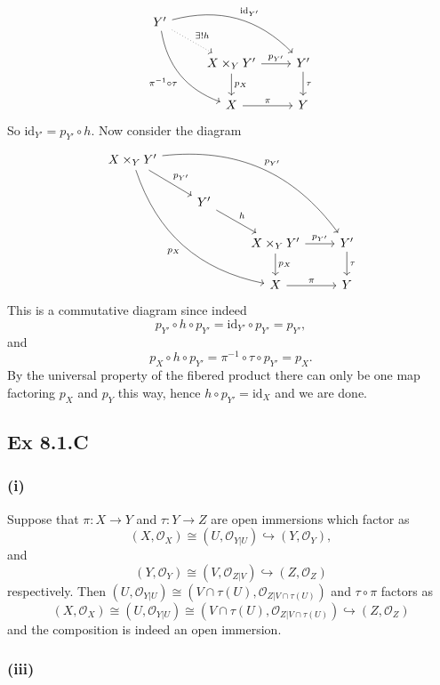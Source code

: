 \documentclass{article}
\theoremstyle{definition}
\newcommand{\id}{\text{id}}
\begin{document}
\[
	\begin{tikzcd}
		Y'
		\ar[dr, dotted, "\exists! h"]
		\ar[drr, "\id_{Y'}", bend left=30]
		\ar[ddr, "\pi^{-1} \circ \tau", bend right=30, swap=true]
		\\
		& X \times_{Y} Y'
		\ar[r, "p_{Y'}"]
		\ar[d, "p_X"]
		& Y'
		\ar[d, "\tau"] \\
		& X
		\ar[r, "\pi"]
		& Y
	\end{tikzcd}
\]
So $\id_{Y'} = p_{Y'} \circ h$. Now consider the diagram
\[
	\begin{tikzcd}
		X \times_Y Y'
		\ar[dr, "p_{Y'}"]
		\ar[ddrrr, "p_{Y'}", bend left=30]
		\ar[dddrr, "p_X", bend right=30, swap=true]
		\\
		& Y'
		\ar[dr, "h"]
		\\
		&& X \times_{Y} Y'
		\ar[r, "p_{Y'}"]
		\ar[d, "p_X"]
		& Y'
		\ar[d, "\tau"] \\
		&& X
		\ar[r, "\pi"]
		& Y
	\end{tikzcd}
\]
This is a commutative diagram since indeed
\[
	p_{Y'} \circ h \circ p_{Y'} = \id_{Y'} \circ p_{Y'} = p_{Y'},
\]
and
\[
	p_X \circ h \circ p_{Y'}
	=
	\pi^{-1} \circ \tau \circ p_{Y'}
	=
	p_X.
\]
By the universal property of the fibered product there can only be one map
factoring $p_X$ and $p_Y$ this way, hence $h \circ p_{Y'} = \id_X$ and we are
done.

\subsection*{Ex 8.1.C}
\subsubsection*{(i)}

Suppose that $\pi : X \to Y$ and $\tau : Y \to Z$ are open immersions which
factor as
\[
	(X, \mathcal{O}_X) \cong (U, \mathcal{O}_{Y \vert U}) \hookrightarrow (Y, \mathcal{O}_Y),
\]
and
\[
	(Y, \mathcal{O}_Y) \cong (V, \mathcal{O}_{Z \vert V}) \hookrightarrow (Z, \mathcal{O}_Z)
\]
respectively. Then $(U, \mathcal{O}_{Y \vert U}) \cong (V \cap \tau(U),
	\mathcal{O}_{Z \vert V \cap \tau(U)})$ and $\tau \circ \pi$ factors as
\[
	(X, \mathcal{O}_X)
	\cong
	(U, \mathcal{O}_{Y \vert U})
	\cong
	(V \cap \tau(U), \mathcal{O}_{Z \vert V \cap \tau(U)})
	\hookrightarrow
	(Z, \mathcal{O}_Z)
\]
and the composition is indeed an open immersion.

\subsubsection*{(iii)}
\end{document}
